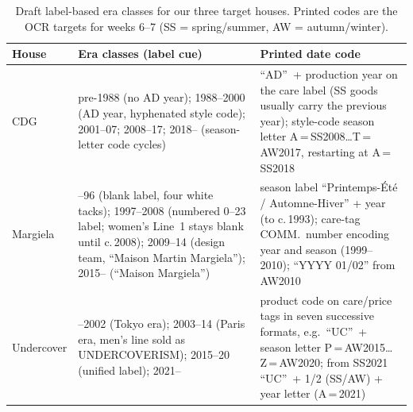 \begin{table}[t]\centering\footnotesize
\caption{Draft label-based era classes for our three target houses. Printed codes are the OCR
targets for weeks 6--7 (SS = spring/summer, AW = autumn/winter).}
\label{tab:eras}
\setlength{\tabcolsep}{3pt}
\begin{tabular}{@{}>{\raggedright\arraybackslash}p{1.25cm}>{\raggedright\arraybackslash}p{3.15cm}>{\raggedright\arraybackslash}p{3.15cm}@{}}\toprule
House & Era classes (label cue) & Printed date code \\\midrule
CDG & pre-1988 (no AD year); 1988--2000 (AD year, hyphenated style code); 2001--07; 2008--17;
2018-- (season-letter code cycles) &
``AD''~+ production year on the care label (SS goods usually carry the previous year); style-code season
letter A\,=\,SS2008\dots T\,=\,AW2017, restarting at A\,=\,SS2018 \\\addlinespace
Margiela & 1988--96 (blank label, four white tacks); 1997--2008 (numbered 0--23 label; women's Line~1 stays blank until c.\,2008);
2009--14 (design team, ``Maison Martin Margiela''); 2015-- (``Maison Margiela'') &
season label ``Printemps-\'Et\'e / Automne-Hiver'' + year (to c.\,1993); care-tag COMM.\ number
encoding year and season (1999--2010); ``YYYY 01/02'' from AW2010 \\\addlinespace
Undercover & 1990--2002 (Tokyo era); 2003--14 (Paris era, men's line sold as UNDERCOVERISM);
2015--20 (unified label); 2021-- &
product code on care/price tags in seven successive formats, e.g.\ ``UC''~+ season letter
P\,=\,AW2015\dots Z\,=\,AW2020; from SS2021 ``UC''~+ 1/2 (SS/AW) + year letter (A\,=\,2021) \\
\bottomrule\end{tabular}\end{table}
